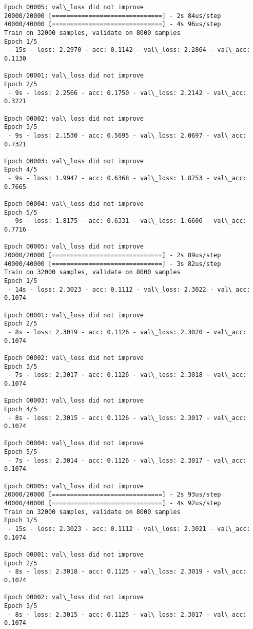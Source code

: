 \documentclass[11pt]{article}
\begin{document}
\begin{Verbatim}[commandchars=\\\{\}]
Epoch 00005: val\_loss did not improve
20000/20000 [==============================] - 2s 84us/step
40000/40000 [==============================] - 4s 96us/step
Train on 32000 samples, validate on 8000 samples
Epoch 1/5
 - 15s - loss: 2.2970 - acc: 0.1142 - val\_loss: 2.2864 - val\_acc: 0.1130

Epoch 00001: val\_loss did not improve
Epoch 2/5
 - 9s - loss: 2.2566 - acc: 0.1750 - val\_loss: 2.2142 - val\_acc: 0.3221

Epoch 00002: val\_loss did not improve
Epoch 3/5
 - 9s - loss: 2.1530 - acc: 0.5695 - val\_loss: 2.0697 - val\_acc: 0.7321

Epoch 00003: val\_loss did not improve
Epoch 4/5
 - 9s - loss: 1.9947 - acc: 0.6368 - val\_loss: 1.8753 - val\_acc: 0.7665

Epoch 00004: val\_loss did not improve
Epoch 5/5
 - 9s - loss: 1.8175 - acc: 0.6331 - val\_loss: 1.6606 - val\_acc: 0.7716

Epoch 00005: val\_loss did not improve
20000/20000 [==============================] - 2s 89us/step
40000/40000 [==============================] - 3s 82us/step
Train on 32000 samples, validate on 8000 samples
Epoch 1/5
 - 14s - loss: 2.3023 - acc: 0.1112 - val\_loss: 2.3022 - val\_acc: 0.1074

Epoch 00001: val\_loss did not improve
Epoch 2/5
 - 8s - loss: 2.3019 - acc: 0.1126 - val\_loss: 2.3020 - val\_acc: 0.1074

Epoch 00002: val\_loss did not improve
Epoch 3/5
 - 7s - loss: 2.3017 - acc: 0.1126 - val\_loss: 2.3018 - val\_acc: 0.1074

Epoch 00003: val\_loss did not improve
Epoch 4/5
 - 8s - loss: 2.3015 - acc: 0.1126 - val\_loss: 2.3017 - val\_acc: 0.1074

Epoch 00004: val\_loss did not improve
Epoch 5/5
 - 7s - loss: 2.3014 - acc: 0.1126 - val\_loss: 2.3017 - val\_acc: 0.1074

Epoch 00005: val\_loss did not improve
20000/20000 [==============================] - 2s 93us/step
40000/40000 [==============================] - 4s 92us/step
Train on 32000 samples, validate on 8000 samples
Epoch 1/5
 - 15s - loss: 2.3023 - acc: 0.1112 - val\_loss: 2.3021 - val\_acc: 0.1074

Epoch 00001: val\_loss did not improve
Epoch 2/5
 - 8s - loss: 2.3018 - acc: 0.1125 - val\_loss: 2.3019 - val\_acc: 0.1074

Epoch 00002: val\_loss did not improve
Epoch 3/5
 - 8s - loss: 2.3015 - acc: 0.1125 - val\_loss: 2.3017 - val\_acc: 0.1074


\end{Verbatim}
\end{document}

